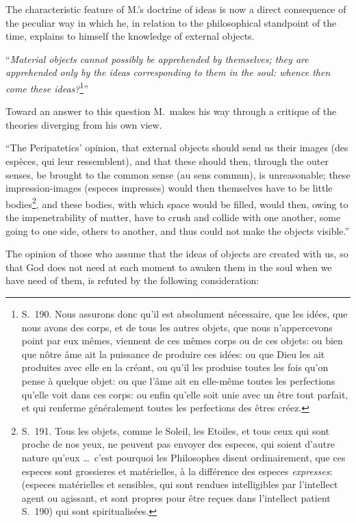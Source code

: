 \documentclass[12pt,a4paper]{article}
\begin{document}
The characteristic feature of M.'s doctrine of ideas is now a direct consequence
of the peculiar way in which he, in relation to the philosophical standpoint of
the time, explains to himself the knowledge of external objects.

``\emph{Material objects cannot possibly be apprehended by themselves; they are
apprehended only by the ideas corresponding to them in the soul: whence then come
these ideas?}\footnote{S.~190. Nous assurons donc qu'il est absolument nécessaire,
que les idées, que nous avons des corps, et de tous les autres objets, que nous
n'appercevons point par eux mêmes, viennent de ces mêmes corps ou de ces objets:
ou bien que nôtre âme ait la puissance de produire ces idées: ou que Dieu les ait
produites avec elle en la créant, ou qu'il les produise toutes les fois qu'on
pense à quelque objet: ou que l'âme ait en elle-même toutes les perfections
qu'elle voit dans ces corps: ou enfin qu'elle soit unie avec un être tout parfait,
et qui renferme généralement toutes les perfections des êtres créez.}''

Toward an answer to this question M.\ makes his way through a critique of the
theories diverging from his own view.

``The Peripatetics' opinion, that external objects should send us their images
(des espèces, qui leur ressemblent), and that these should then, through the outer
senses, be brought to the common sense (au sens commun),
is unreasonable; these impression-images (especes impresses) would then themselves
have to be little bodies\footnote{S.~191. Tous les objets, comme le Soleil, les
Etoiles, et tous ceux qui sont proche de nos yeux, ne peuvent pas envoyer des
especes, qui soient d'autre nature qu'eux \dots\ c'est pourquoi les Philosophes
disent ordinairement, que ces especes sont grossieres et matérielles, à la
différence des especes \emph{expresses}: (especes matérielles et sensibles, qui
sont rendues intelligibles par l'intellect agent ou agissant, et sont propres pour
être reçues dans l'intellect patient S.~190) qui sont spiritualisées.}, and these
bodies, with which space would be filled, would then, owing to the impenetrability
of matter, have to crush and collide with one another, some going to one side,
others to another, and thus could not make the objects visible.''

The opinion of those who assume that the ideas of objects are created with us, so
that God does not need at each moment to awaken them in the soul when we have need
of them, is refuted by the following consideration:
\end{document}
